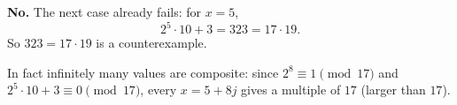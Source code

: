 \textbf{No.} The next case already fails: for $x=5$,
\[
2^5\cdot10+3=323=17\cdot19 .
\]
So $\boxed{323=17\cdot19}$ is a counterexample.

In fact infinitely many values are composite: since $2^8\equiv1\pmod{17}$ and $2^5\cdot10+3\equiv0\pmod{17}$, every $x=5+8j$ gives a multiple of $17$ (larger than $17$).
